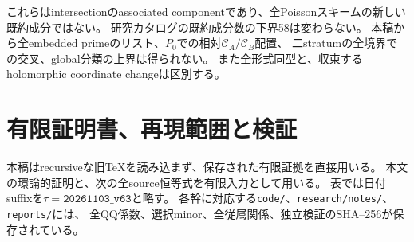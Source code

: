 \documentclass[11pt,a4paper]{ltjsarticle}
\newcommand{\CA}{\mathcal C_A}
\newcommand{\CB}{\mathcal C_B}
\theoremstyle{definition}
\theoremstyle{remark}
\begin{document}
これらはintersectionのassociated componentであり、全Poissonスキームの新しい既約成分ではない。
研究カタログの既約成分数の下界58は変わらない。
本稿から全embedded primeのリスト、$P_0$での相対$\CA/\CB$配置、
二stratumの全境界での交叉、global分類の上界は得られない。
また全形式同型と、収束するholomorphic coordinate changeは区別する。

\appendix
\section{有限証明書、再現範囲と検証}

本稿はrecursiveな旧TeXを読み込まず、保存された有限証拠\cite{repo}を直接用いる。
本文の環論的証明と、次の全source恒等式を有限入力として用いる。
表では日付suffixを$\tau=\texttt{20261103\_v63}$と略す。
各幹に対応する\texttt{code/}、\texttt{research/notes/}、\texttt{reports/}には、
全QQ係数、選択minor、全従属関係、独立検証のSHA--256が保存されている。
\end{document}
